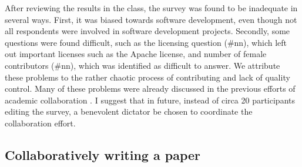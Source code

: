 After reviewing the results in the class, the survey was found to be inadequate in several ways. First, it was biased towards software development, even though not all respondents were involved in software development projects. Secondly, some questions were found difficult, such as the licensing question (\#nn), which left out important licenses such as the Apache license, and number of female contributors (\#nn), which was identified as difficult to answer. We attribute these problems to the rather chaotic process of contributing and lack of quality control.  Many of these problems were already discussed in the previous efforts of academic collaboration \cite{Tomlinson2012}. I suggest that in future, instead of circa 20 participants editing the survey, a benevolent dictator be chosen to coordinate the collaboration effort.

\subsection{Collaboratively writing a paper}

